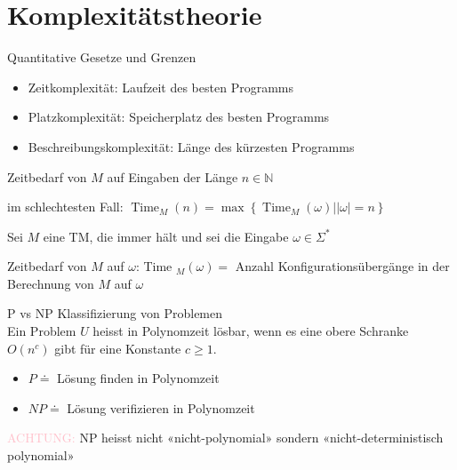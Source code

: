 \graphicspath{{images/}}

\section*{Komplexitätstheorie}

\begin{definition}{Quantitative Gesetze und Grenzen}

    \begin{itemize}
    \item Zeitkomplexität: Laufzeit des besten Programms
    \item Platzkomplexität: Speicherplatz des besten Programms
    \item Beschreibungskomplexität: Länge des kürzesten Programms
    \end{itemize}
\end{definition}

\begin{theorem}{Zeitbedarf}
    von $M$ auf Eingaben der Länge $n \in \mathbb{N}$ 
    
    im schlechtesten Fall: $\operatorname{Time}_{M}(n)=\max \left\{\operatorname{Time}_{M}(\omega)|| \omega \mid=n\right\}$
    
    \vspace{1mm}

    Sei $M$ eine TM, die immer hält und sei die Eingabe $\omega \in \Sigma^{*}$
    
    Zeitbedarf von $M$ auf $\omega$: Time $_{M}(\omega)=$ Anzahl Konfigurationsübergänge in der Berechnung von $M$ auf $\omega$
\end{theorem}

\begin{KR}{P vs NP}
    Klassifizierung von Problemen\\
    Ein Problem $U$ heisst in Polynomzeit lösbar, wenn es eine obere Schranke $O\left(n^{c}\right)$ gibt für eine Konstante $c \geq 1$.
    \begin{itemize}
    \item $P \doteq $ Lösung finden in Polynomzeit
    \item $N P \doteq $ Lösung verifizieren in Polynomzeit
    \end{itemize}
\end{KR}

\begin{remark}
    \textcolor{pink}{ACHTUNG:} NP heisst nicht «nicht-polynomial» sondern «nicht-deterministisch polynomial»
\end{remark}

